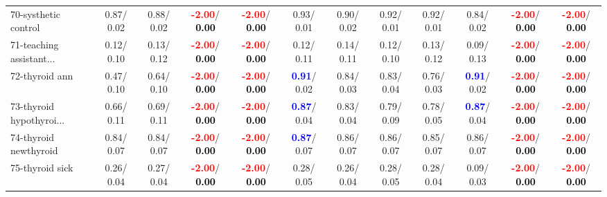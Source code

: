 \begin{table}[h]
\begin{center}
{\begin{tabular}{lc|c|c|c|c|c|c|c|c|c|c}
70-systhetic control &   0.87/  0.02 &   0.88/  0.02 & \textcolor{red}{\textbf{ -2.00}}/\textcolor{black}{\textbf{  0.00}} & \textcolor{red}{\textbf{ -2.00}}/\textcolor{black}{\textbf{  0.00}} &   0.93/  0.01 &   0.90/  0.02 &   0.92/  0.01 &   0.92/  0.01 &   0.84/  0.02 & \textcolor{red}{\textbf{ -2.00}}/\textcolor{black}{\textbf{  0.00}} & \textcolor{red}{\textbf{ -2.00}}/\textcolor{black}{\textbf{  0.00}} \\
71-teaching assistant... &   0.12/  0.10 &   0.13/  0.12 & \textcolor{red}{\textbf{ -2.00}}/\textcolor{black}{\textbf{  0.00}} & \textcolor{red}{\textbf{ -2.00}}/\textcolor{black}{\textbf{  0.00}} &   0.12/  0.11 &   0.14/  0.11 &   0.12/  0.10 &   0.13/  0.12 &   0.09/  0.13 & \textcolor{red}{\textbf{ -2.00}}/\textcolor{black}{\textbf{  0.00}} & \textcolor{red}{\textbf{ -2.00}}/\textcolor{black}{\textbf{  0.00}} \\ \hline
72-thyroid ann &   0.47/  0.10 &   0.64/  0.10 & \textcolor{red}{\textbf{ -2.00}}/\textcolor{black}{\textbf{  0.00}} & \textcolor{red}{\textbf{ -2.00}}/\textcolor{black}{\textbf{  0.00}} & \textcolor{blue}{\textbf{  0.91}}/  0.02 &   0.84/  0.03 &   0.83/  0.04 &   0.76/  0.03 & \textcolor{blue}{\textbf{  0.91}}/  0.02 & \textcolor{red}{\textbf{ -2.00}}/\textcolor{black}{\textbf{  0.00}} & \textcolor{red}{\textbf{ -2.00}}/\textcolor{black}{\textbf{  0.00}} \\
73-thyroid hypothyroi... &   0.66/  0.11 &   0.69/  0.11 & \textcolor{red}{\textbf{ -2.00}}/\textcolor{black}{\textbf{  0.00}} & \textcolor{red}{\textbf{ -2.00}}/\textcolor{black}{\textbf{  0.00}} & \textcolor{blue}{\textbf{  0.87}}/  0.04 &   0.83/  0.04 &   0.79/  0.09 &   0.78/  0.05 & \textcolor{blue}{\textbf{  0.87}}/  0.04 & \textcolor{red}{\textbf{ -2.00}}/\textcolor{black}{\textbf{  0.00}} & \textcolor{red}{\textbf{ -2.00}}/\textcolor{black}{\textbf{  0.00}} \\
74-thyroid newthyroid &   0.84/  0.07 &   0.84/  0.07 & \textcolor{red}{\textbf{ -2.00}}/\textcolor{black}{\textbf{  0.00}} & \textcolor{red}{\textbf{ -2.00}}/\textcolor{black}{\textbf{  0.00}} & \textcolor{blue}{\textbf{  0.87}}/  0.07 &   0.86/  0.07 &   0.86/  0.07 &   0.85/  0.07 &   0.86/  0.07 & \textcolor{red}{\textbf{ -2.00}}/\textcolor{black}{\textbf{  0.00}} & \textcolor{red}{\textbf{ -2.00}}/\textcolor{black}{\textbf{  0.00}} \\
75-thyroid sick &   0.26/  0.04 &   0.27/  0.04 & \textcolor{red}{\textbf{ -2.00}}/\textcolor{black}{\textbf{  0.00}} & \textcolor{red}{\textbf{ -2.00}}/\textcolor{black}{\textbf{  0.00}} &   0.28/  0.05 &   0.26/  0.04 &   0.28/  0.05 &   0.28/  0.04 &   0.09/  0.03 & \textcolor{red}{\textbf{ -2.00}}/\textcolor{black}{\textbf{  0.00}} & \textcolor{red}{\textbf{ -2.00}}/\textcolor{black}{\textbf{  0.00}} \\

\end{tabular}}
\end{center}
\end{table}
